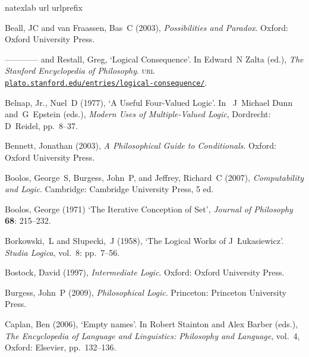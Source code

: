 \documentclass[openany,leqno,11pt]{book}
\theoremstyle{break}
\theoremstyle{definition}
\theoremstyle{remark}
\begin{document}
{\small {}\label{biblio}
\begin{thebibliography}{39}
\newcommand{\enquote}[1]{‘#1’}
\expandafter\ifx\csname natexlab\endcsname\relax\def\natexlab#1{#1}\fi
\expandafter\ifx\csname url\endcsname\relax
  \def\url#1{{\tt #1}}\fi
\expandafter\ifx\csname urlprefix\endcsname\relax\def\urlprefix{\textsc{url} }\fi

Beall, JC and van Fraassen, Bas~C (2003), \emph{Possibilities and Paradox}.
  Oxford: Oxford University Press.

---\!\!---\!\!---\!\!--- and Restall, Greg, \enquote{Logical Consequence}.  In Edward~N Zalta (ed.), \emph{The Stanford Encyclopedia of Philosophy}. \urlprefix\href{http://plato.stanford.edu/entries/logical-consequence/}{\nolinkurl{plato.stanford.edu/entries/logical-consequence/}}.

{Belnap, Jr.}, Nuel~D (1977), \enquote{A Useful Four-Valued Logic}. In
 ~J~Michael Dunn and~G~Epstein (eds.), \emph{Modern Uses of Multiple-Valued
  Logic}, Dordrecht: D~Reidel, pp.~8–37.

Bennett, Jonathan (2003), \emph{A Philosophical Guide to Conditionals}.
  Oxford: Oxford University Press.

Boolos, George~S, Burgess, John~P, and Jeffrey, Richard~C (2007), \emph{
  Computability and Logic}. Cambridge: Cambridge University Press, 5 ed.

 Boolos, George (1971) ‘The Iterative Conception of Set’, \emph{Journal of Philosophy} \textbf{68}: 215–232.


Borkowski,~L and S{\l}upecki,~J (1958), \enquote{The Logical Works of J~{\L}ukasiewicz}. \emph{Studia Logica}, vol.~8: pp.~7–56.

Bostock, David (1997), \emph{Intermediate Logic}. Oxford: Oxford University
  Press.

Burgess, John~P (2009), \emph{Philosophical Logic}. Princeton: Princeton
  University Press.

Caplan, Ben (2006), \enquote{Empty names}. In Robert Stainton and Alex Barber
  (eds.), \emph{The Encyclopedia of Language and Linguistics: Philosophy and
  Language}, vol.~4, Oxford: Elsevier, pp.~132–136.


\end{thebibliography}}
\end{document}
